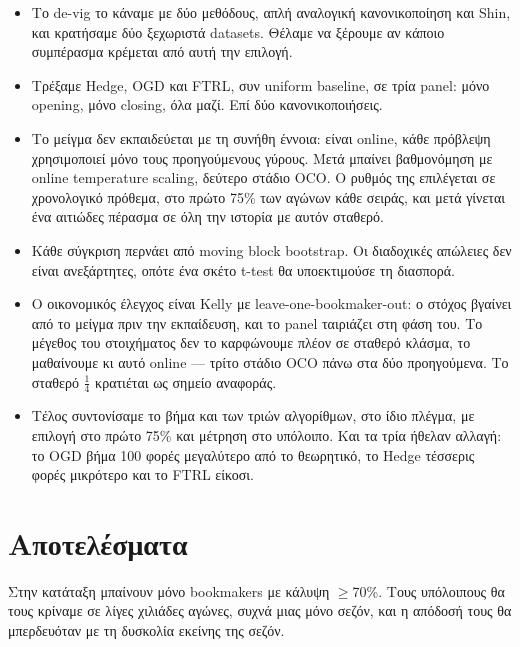 \documentclass[11pt,a4paper]{article}
\renewcommand{\_}{\oldunderscore\allowbreak}
\begin{document}
\begin{itemize}
  \item Το de-vig το κάναμε με δύο μεθόδους, απλή αναλογική κανονικοποίηση και Shin, και
        κρατήσαμε δύο ξεχωριστά datasets. Θέλαμε να ξέρουμε αν κάποιο συμπέρασμα κρέμεται
        από αυτή την επιλογή.
  \item Τρέξαμε Hedge, OGD και FTRL, συν uniform baseline, σε τρία panel: μόνο opening, μόνο
        closing, όλα μαζί. Επί δύο κανονικοποιήσεις.
  \item Το μείγμα δεν εκπαιδεύεται με τη συνήθη έννοια: είναι online, κάθε πρόβλεψη
        χρησιμοποιεί μόνο τους προηγούμενους γύρους. Μετά μπαίνει βαθμονόμηση με online
        temperature scaling, δεύτερο στάδιο OCO. Ο ρυθμός της επιλέγεται σε χρονολογικό
        πρόθεμα, στο πρώτο 75\% των αγώνων κάθε σειράς, και μετά γίνεται ένα αιτιώδες
        πέρασμα σε όλη την ιστορία με αυτόν σταθερό.
  \item Κάθε σύγκριση περνάει από moving block bootstrap. Οι διαδοχικές απώλειες δεν είναι
        ανεξάρτητες, οπότε ένα σκέτο t-test θα υποεκτιμούσε τη διασπορά.
  \item Ο οικονομικός έλεγχος είναι Kelly με leave-one-bookmaker-out: ο στόχος βγαίνει από
        το μείγμα πριν την εκπαίδευση, και το panel ταιριάζει στη φάση του. Το μέγεθος του
        στοιχήματος δεν το καρφώνουμε πλέον σε σταθερό κλάσμα, το μαθαίνουμε κι αυτό online
        --- τρίτο στάδιο OCO πάνω στα δύο προηγούμενα. Το σταθερό $\tfrac14$ κρατιέται ως
        σημείο αναφοράς.
  \item Τέλος συντονίσαμε το βήμα και των τριών αλγορίθμων, στο ίδιο πλέγμα, με επιλογή στο
        πρώτο 75\% και μέτρηση στο υπόλοιπο. Και τα τρία ήθελαν αλλαγή: το OGD βήμα 100 φορές
        μεγαλύτερο από το θεωρητικό, το Hedge τέσσερις φορές μικρότερο και το FTRL είκοσι.
\end{itemize}

\section{Αποτελέσματα}

Στην κατάταξη μπαίνουν μόνο bookmakers με κάλυψη $\geq$70\%. Τους υπόλοιπους θα τους
κρίναμε σε λίγες χιλιάδες αγώνες, συχνά μιας μόνο σεζόν, και η απόδοσή τους θα μπερδευόταν
με τη δυσκολία εκείνης της σεζόν.
\end{document}
